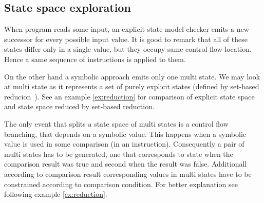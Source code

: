 \subsection{State space exploration}

When program reads some input, an explicit state model checker emits a
new successor for every possible input value. It is good to remark that all of
these states differ only in a single value, but they occupy same control flow
location. Hence a same sequence of instructions is applied to them.


On the other hand a symbolic approach emits only one multi state. We may look at
multi state as it represents a set of purely explicit states (defined by
set-based reducion~\cite{Havel14}). See an example \ref{ex:reduction} for comparison of
explicit state space and state space reduced by set-based reduction.

The only event that splits a state space of multi states is a control flow branching,
that depends on a symbolic value. This happens when a symbolic value is used in
some comparison (in \LLVM an  instruction). Consequently a pair of
multi states has to be generated, one that corresponds to state when the
comparison result was true and second when the result was false. Additionall
according to comparison result corresponding values in multi states have
to be constrained according to comparison condition. For better explanation see
following example \ref{ex:reduction}.

